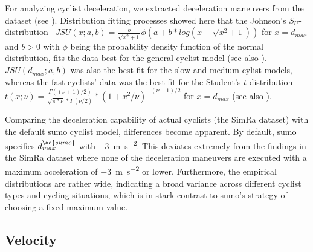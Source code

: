 For analyzing cyclist deceleration, we extracted deceleration maneuvers from the dataset (see ).
Distribution fitting processes showed here that the Johnson's $S_{U}$-distribution~\cite{johnson1949systems} $JSU(x; a,b) = \frac{b}{\sqrt{x^2+1}}\phi(a+b*log(x+\sqrt{x^2+1}))$ for $x=d_{max}$ and $b>0$ with $\phi$ being the probability density function of the normal distribution, fits the data best for the general cyclist model (see also ).
$JSU(d_{max}; a,b)$ was also the best fit for the slow and medium cylist models, whereas the fast cyclists' data was the best fit for the Student's $t$-distribution~\cite{student1908probable} $t(x; \nu)=\frac{\Gamma((\nu+1)/2)}{\sqrt{\pi*\nu}*\Gamma(\nu/2)}*(1+x^2/\nu)^{-(\nu+1)/2}$ for $x=d_{max}$ (see also ).

Comparing the deceleration capability of actual cyclists (the SimRa dataset) with the default \ac{sumo} cyclist model, differences become apparent.
By default, \ac{sumo} specifies $d_{max}^{\ac{sumo}}$ with \SI{-3}{\metre\per\square\second}.
This deviates extremely from the findings in the SimRa dataset where none of the deceleration maneuvers are executed with a maximum acceleration of \SI{-3}{\metre\per\square\second} or lower.
Furthermore, the empirical distributions are rather wide, indicating a broad variance across different cyclist types and cycling situations, which is in stark contrast to \ac{sumo}'s strategy of choosing a fixed maximum value.

\subsection{Velocity}
\label{subsec:velocity_preprocessing}

